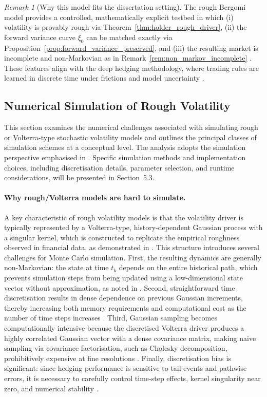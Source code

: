 \documentclass[12pt,a4paper]{article}
\theoremstyle{definition}
\theoremstyle{plain}
\theoremstyle{remark}
\newtheorem{remark}{Remark}[section]
\theoremstyle{plain}
\begin{document}
\begin{remark}[Why this model fits the dissertation setting]
\label{rem:rbm_for_dissertation}
The rough Bergomi model provides a controlled, mathematically explicit testbed in which (i) volatility is provably rough via Theorem~\ref{thm:holder_rough_driver}, (ii) the forward variance curve $\xi_0$ can be matched exactly via Proposition~\ref{prop:forward_variance_preserved}, and (iii) the resulting market is incomplete and non-Markovian as in Remark~\ref{rem:non_markov_incomplete} \cite{BayerFriz2016,GatheralRough}. 
These features align with the deep hedging methodology, where trading rules are learned in discrete time under frictions and model uncertainty \cite{Buehler2019DeepHedging,Horvath2021DeepRough}.
\end{remark}

\subsection{Numerical Simulation of Rough Volatility}
\label{subsec:rough_vol_sim}

This section examines the numerical challenges associated with simulating rough or Volterra-type stochastic volatility models and outlines the principal classes of simulation schemes at a conceptual level. The analysis adopts the simulation perspective emphasised in \cite{BayerFriz2016}. Specific simulation methods and implementation choices, including discretisation details, parameter selection, and runtime considerations, will be presented in Section~5.3.

\paragraph{Why rough/Volterra models are hard to simulate.}
A key characteristic of rough volatility models is that the volatility driver is typically represented by a Volterra-type, history-dependent Gaussian process with a singular kernel, which is constructed to replicate the empirical roughness observed in financial data, as demonstrated in \cite{GatheralRough,BayerFriz2016}. This structure introduces several challenges for Monte Carlo simulation.
First, the resulting dynamics are generally non-Markovian: the state at time $t_k$ depends on the entire historical path, which prevents simulation steps from being updated using a low-dimensional state vector without approximation, as noted in \cite{BayerFriz2016}. Second, straightforward time discretisation results in dense dependence on previous Gaussian increments, thereby increasing both memory requirements and computational cost as the number of time steps increases \cite{BayerFriz2016}. Third, Gaussian sampling becomes computationally intensive because the discretised Volterra driver produces a highly correlated Gaussian vector with a dense covariance matrix, making naive sampling via covariance factorisation, such as Cholesky decomposition, prohibitively expensive at fine resolutions \cite{BayerFriz2016}. Finally, discretisation bias is significant: since hedging performance is sensitive to tail events and pathwise errors, it is necessary to carefully control time-step effects, kernel singularity near zero, and numerical stability \cite{BayerFriz2016}.
\end{document}
